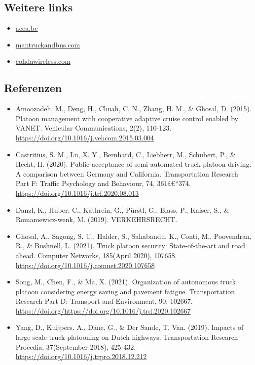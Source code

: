 \documentclass[
]{book}
\providecommand{\tightlist}{%
  \setlength{\itemsep}{0pt}\setlength{\parskip}{0pt}}
\begin{document}
\hypertarget{weitere-links-8}{%
\subsection*{Weitere links}\label{weitere-links-8}}

\begin{itemize}
\tightlist
\item
  \href{https://www.acea.be/uploads/publications/Platooning_roadmap.pdf}{acea.be}
\item
  \href{https://www.mantruckandbus.com/en/innovation/why-platooning-is-the-future-of-delivery-traffic.html}{mantruckandbus.com}
\item
  \href{https://cohdawireless.com/platooning/}{cohdawireless.com}
\end{itemize}

\hypertarget{referenzen-10}{%
\subsection*{Referenzen}\label{referenzen-10}}

\begin{itemize}
\tightlist
\item
  Amoozadeh, M., Deng, H., Chuah, C. N., Zhang, H. M., \& Ghosal, D. (2015). Platoon management with cooperative adaptive cruise control enabled by VANET. Vehicular Communications, 2(2), 110-123. \url{https://doi.org/10.1016/j.vehcom.2015.03.004}
\item
  Castritius, S. M., Lu, X. Y., Bernhard, C., Liebherr, M., Schubert, P., \& Hecht, H. (2020). Public acceptance of semi-automated truck platoon driving. A comparison between Germany and California. Transportation Research Part F: Traffic Psychology and Behaviour, 74, 361â€``374. \url{https://doi.org/10.1016/j.trf.2020.08.013}
\item
  Danzl, K., Huber, C., Kathrein, G., Pürstl, G., Blass, P., Kaiser, S., \& Romaniewicz-wenk, M. (2019). VERKEHRSRECHT.
\item
  Ghosal, A., Sagong, S. U., Halder, S., Sahabandu, K., Conti, M., Poovendran, R., \& Bushnell, L. (2021). Truck platoon security: State-of-the-art and road ahead. Computer Networks, 185(April 2020), 107658. \url{https://doi.org/10.1016/j.comnet.2020.107658}
\item
  Song, M., Chen, F., \& Ma, X. (2021). Organization of autonomous truck platoon considering energy saving and pavement fatigue. Transportation Research Part D: Transport and Environment, 90, 102667. \url{https://doi.org/https://doi.org/10.1016/j.trd.2020.102667}
\item
  Yang, D., Kuijpers, A., Dane, G., \& Der Sande, T. Van. (2019). Impacts of large-scale truck platooning on Dutch highways. Transportation Research Procedia, 37(September 2018), 425-432. \url{https://doi.org/10.1016/j.trpro.2018.12.212}
\end{itemize}
\end{document}
